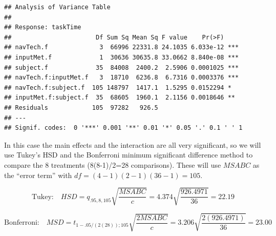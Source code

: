 \documentclass[
]{book}
\begin{document}
\begin{verbatim}
## Analysis of Variance Table
## 
## Response: taskTime
##                       Df Sum Sq Mean Sq F value    Pr(>F)    
## navTech.f              3  66996 22331.8 24.1035 6.033e-12 ***
## inputMet.f             1  30636 30635.8 33.0662 8.840e-08 ***
## subject.f             35  84008  2400.2  2.5906 0.0001025 ***
## navTech.f:inputMet.f   3  18710  6236.8  6.7316 0.0003376 ***
## navTech.f:subject.f  105 148797  1417.1  1.5295 0.0152294 *  
## inputMet.f:subject.f  35  68605  1960.1  2.1156 0.0018646 ** 
## Residuals            105  97282   926.5                      
## ---
## Signif. codes:  0 '***' 0.001 '**' 0.01 '*' 0.05 '.' 0.1 ' ' 1
\end{verbatim}

In this case the main effects and the interaction are all very
significant, so we will use Tukey's HSD and the Bonferroni minimum
significant difference method to compare the 8 treatments (8(8-1)/2=28
comparisons). These will use \(MSABC\) as the ``error term'' with
\(df=(4-1)(2-1)(36-1)=105\).

\[
\mbox{Tukey:} \quad HSD = q_{.95,8,105}\sqrt{\frac{MSABC}{c}}
=4.374\sqrt{\frac{926.4971}{36}}=22.19 
\]

\[
\mbox{Bonferroni:} \quad MSD=t_{1-.05/(2(28));105}\sqrt{\frac{2MSABC}{c}}
=3.206\sqrt{\frac{2(926.4971)}{36}}=23.00
\]
\end{document}
